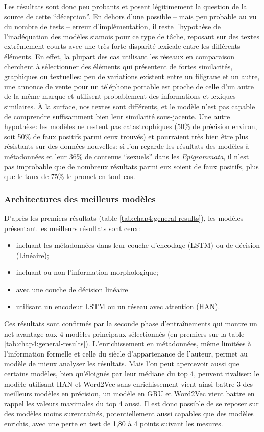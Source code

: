 Les résultats sont donc peu probants et posent légitimement la question de la source de cette \enquote{déception}. En dehors d'une possible -- mais peu probable au vu du nombre de tests -- erreur d'implémentation, il reste l'hypothèse de l'inadéquation des modèles siamois pour ce type de tâche, reposant sur des textes extrêmement courts avec une très forte disparité lexicale entre les différents éléments. En effet, la plupart des cas utilisant les réseaux en comparaison cherchent à sélectionner des éléments qui présentent de fortes similarités, graphiques ou textuelles: peu de variations existent entre un filigrane et un autre, une annonce de vente pour un téléphone portable est proche de celle d'un autre de la même marque et utilisent probablement des informations et lexiques similaires. À la surface, nos textes sont différents, et le modèle n'est pas capable de comprendre suffisamment bien leur similarité sous-jacente. Une autre hypothèse: les modèles ne restent pas catastrophiques (50\% de précision environ, soit 50\% de faux positifs parmi ceux trouvés) et pourraient très bien être plus résistants sur des données nouvelles: si l'on regarde les résultats des modèles à métadonnées et leur 36\% de contenus \enquote{sexuels} dans les \textit{Epigrammata}, il n'est pas improbable que de nombreux résultats parmi eux soient de faux positifs, plus que le taux de 75\% le promet en tout cas.

\subsubsection{Architectures des meilleurs modèles}

D'après les premiers résultats (table \ref{tab:chap4:general-results}), les modèles présentant les meilleurs résultats sont ceux:
\begin{itemize}
    \item incluant les métadonnées dans leur couche d'encodage (LSTM) ou de décision (Linéaire);
    \item incluant ou non l'information morphologique;
    \item avec une couche de décision linéaire
    \item utilisant un encodeur LSTM ou un réseau avec attention (HAN).
\end{itemize}

Ces résultats sont confirmés par la seconde phase d'entraînements qui montre un net avantage aux 4 modèles principaux sélectionnés (en premiers sur la table \ref{tab:chap4:general-results}). L'enrichissement en métadonnées, même limitées à l'information formelle et celle du siècle d'appartenance de l'auteur, permet au modèle de mieux analyser les résultats. Mais l'on peut apercevoir aussi que certains modèles, bien qu'éloignés par leur médiane du top 4, peuvent rivaliser: le modèle utilisant HAN et Word2Vec sans enrichissement vient ainsi battre 3 des meilleurs modèles en précision, un modèle en GRU et Word2Vec vient battre en rappel les valeurs maximales du top 4 aussi. Il est donc possible de se reposer sur des modèles moins surentraînés, potentiellement aussi capables que des modèles enrichis, avec une perte en test de 1,80 à 4 points suivant les mesures.

